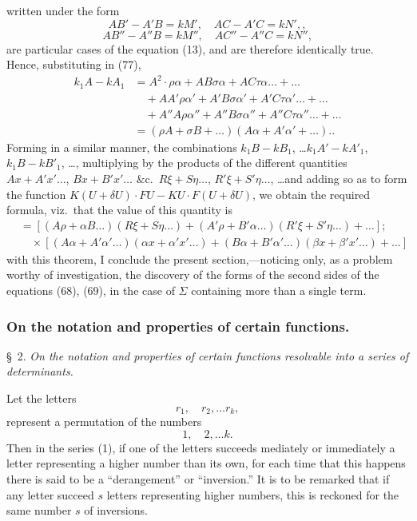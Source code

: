 \documentclass[11pt,a4paper]{book}
\begin{document}
written under the form
\[
AB' - A'B = kM', \quad AC - A'C = kN', \tag{79},
\]
\[
AB'' - A''B = kM'', \quad AC'' - A''C = kN'',
\]
are particular cases of the equation (13), and are therefore identically true. Hence,
substituting in (77),
\begin{align*}
k_1A - kA_1 &= A^2\cdot\rho\alpha + AB\sigma\alpha + AC\tau\alpha \ldots + \ldots \\
&\quad + AA'\rho\alpha' + A'B\sigma\alpha' + A'C\tau\alpha' \ldots + \ldots \\
&\quad + A''A\rho\alpha'' + A''B\sigma\alpha'' + A''C\tau\alpha'' \ldots + \ldots \\
&= (\rho A + \sigma B + \ldots)(A\alpha + A'\alpha' + \ldots).
\tag{80}.
\end{align*}
Forming in a similar manner, the combinations $k_1B - kB_1$, \ldots $k_1A' - kA'_1$, $k_1B - kB'_1$, \ldots,
multiplying by the products of the different quantities $Ax + A'x'\ldots$, $Bx + B'x' \ldots$
$\&$c.\ $R\xi + S\eta\ldots$, $R'\xi + S'\eta\ldots$, \ldots and adding so as to form the function $K(U+\delta U) \cdot FU
- KU \cdot F(U+\delta U)$, we obtain the required formula, viz.\ that the value of this quantity is
\begin{align*}
&= [(A\rho + \alpha B \ldots)(R\xi + S\eta \ldots) + (A'\rho + B'\alpha \ldots)(R'\xi + S'\eta \ldots) + \ldots] \tag{81};\\
&\quad \times [(A\alpha + A'\alpha' \ldots)(\alpha x + \alpha'x' \ldots) + (B\alpha + B'\alpha' \ldots)(\beta x + \beta'x' \ldots) + \ldots]
\end{align*}
with this theorem, I conclude the present section,---noticing only, as a problem worthy
of investigation, the discovery of the forms of the second sides of the equations
(68), (69), in the case of $\Sigma$ containing more than a single term.

\newpage
\subsubsection{On the notation and properties of certain functions.}

\textsc{\S\ 2.} \textit{On the notation and properties of certain functions resolvable into a series
of determinants.}

Let the letters
\[
r_1, \quad r_2, \ldots r_k
\tag{1},
\]
represent a permutation of the numbers
\[
1, \quad 2, \ldots k
\tag{2}.
\]
Then in the series (1), if one of the letters succeeds mediately or immediately
a letter representing a higher number than its own, for each time that this happens
there is said to be a ``derangement'' or ``inversion.'' It is to be remarked that if
any letter succeed $s$ letters representing higher numbers, this is reckoned for the
same number $s$ of inversions.
\end{document}
